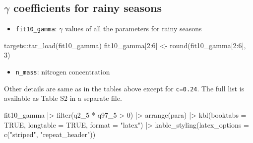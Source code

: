 \documentclass[
  11pt,
  letterpaper,
  DIV=11,
  numbers=noendperiod]{scrartcl}
\newenvironment{Shaded}{}{}
\newcommand{\AttributeTok}[1]{\textcolor[rgb]{0.84,0.23,0.29}{#1}}
\newcommand{\ConstantTok}[1]{\textcolor[rgb]{0.00,0.36,0.77}{#1}}
\newcommand{\DecValTok}[1]{\textcolor[rgb]{0.00,0.36,0.77}{#1}}
\newcommand{\FunctionTok}[1]{\textcolor[rgb]{0.44,0.26,0.76}{#1}}
\newcommand{\NormalTok}[1]{\textcolor[rgb]{0.14,0.16,0.18}{#1}}
\newcommand{\OtherTok}[1]{\textcolor[rgb]{0.44,0.26,0.76}{#1}}
\newcommand{\SpecialCharTok}[1]{\textcolor[rgb]{0.00,0.36,0.77}{#1}}
\newcommand{\StringTok}[1]{\textcolor[rgb]{0.01,0.18,0.38}{#1}}
\providecommand{\tightlist}{%
  \setlength{\itemsep}{0pt}\setlength{\parskip}{0pt}}\usepackage{longtable,booktabs,array}
\begin{document}
\hypertarget{gamma-coefficients-for-rainy-seasons}{%
\subsection{\texorpdfstring{\(\gamma\) coefficients for rainy
seasons}{\textbackslash gamma coefficients for rainy seasons}}\label{gamma-coefficients-for-rainy-seasons}}

\begin{itemize}
\tightlist
\item
  \texttt{fit10\_gamma}: \(\gamma\) values of all the parameters for
  rainy seasons
\end{itemize}

\begin{Shaded}
\begin{Highlighting}[]
\NormalTok{targets}\SpecialCharTok{::}\FunctionTok{tar\_load}\NormalTok{(fit10\_gamma)}
\NormalTok{fit10\_gamma[}\DecValTok{2}\SpecialCharTok{:}\DecValTok{6}\NormalTok{] }\OtherTok{\textless{}{-}} \FunctionTok{round}\NormalTok{(fit10\_gamma[}\DecValTok{2}\SpecialCharTok{:}\DecValTok{6}\NormalTok{], }\DecValTok{3}\NormalTok{)}
\end{Highlighting}
\end{Shaded}

\begin{itemize}
\tightlist
\item
  \texttt{n\_mass}: nitrogen concentration
\end{itemize}

Other details are same as in the tables above except for
\texttt{c=0.24}. The full list is available as Table S2 in a separate
file.

\begin{Shaded}
\begin{Highlighting}[]
\NormalTok{fit10\_gamma }\SpecialCharTok{|\textgreater{}}
  \FunctionTok{filter}\NormalTok{(q2\_5 }\SpecialCharTok{*}\NormalTok{ q97\_5 }\SpecialCharTok{\textgreater{}} \DecValTok{0}\NormalTok{) }\SpecialCharTok{|\textgreater{}}
  \FunctionTok{arrange}\NormalTok{(para) }\SpecialCharTok{|\textgreater{}}
  \FunctionTok{kbl}\NormalTok{(}\AttributeTok{booktabs =} \ConstantTok{TRUE}\NormalTok{, }\AttributeTok{longtable =} \ConstantTok{TRUE}\NormalTok{, }\AttributeTok{format =} \StringTok{"latex"}\NormalTok{) }\SpecialCharTok{|\textgreater{}}
  \FunctionTok{kable\_styling}\NormalTok{(}\AttributeTok{latex\_options =} \FunctionTok{c}\NormalTok{(}\StringTok{"striped"}\NormalTok{, }\StringTok{"repeat\_header"}\NormalTok{))}
\end{Highlighting}
\end{Shaded}
\end{document}
